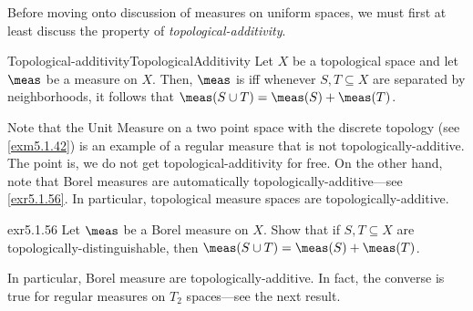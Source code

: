 Before moving onto discussion of measures on uniform spaces, we must first at least discuss the property of \emph{topological-additivity}.
\begin{dfn}{Topological-additivity}{TopologicalAdditivity}
Let $X$ be a topological space and let $\meas$ be a measure on $X$.  Then, $\meas$ is  iff whenever $S,T\subseteq X$ are separated by neighborhoods, it follows that $\meas (S\cup T)=\meas (S)+\meas (T)$.
\begin{rmk}
Note that the Unit Measure on a two point space with the discrete topology (see \cref{exm5.1.42}) is an example of a regular measure that is not topologically-additive.  The point is, we do not get topological-additivity for free.  On the other hand, note that Borel measures are automatically topologically-additive---see \cref{exr5.1.56}.  In particular, topological measure spaces are topologically-additive.
\end{rmk}
\end{dfn}
\begin{exr}{}{exr5.1.56}
Let $\meas$ be a Borel measure on $X$.  Show that if $S,T\subseteq X$ are topologically-distinguishable, then $\meas (S\cup T)=\meas (S)+\meas (T)$.
\begin{rmk}
In particular, Borel measure are topologically-additive.  In fact, the converse is true for regular measures on $T_2$ spaces---see the next result.
\end{rmk}
\end{exr}
